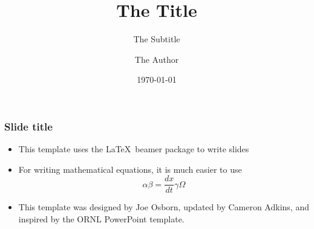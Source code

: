 \documentclass[aspectratio=169, 16pt]{beamer}
\title{The Title}
\subtitle{The Subtitle}
\author{The Author}
\date{\today}
\begin{document}
    \maketitlepage

    \begin{frame}
        \frametitle{\Large{Slide title}}
    	\centering
    	\begin{itemize}
    		\item This template uses the \LaTeX~beamer package to write slides
    		\item For writing mathematical equations, it is much easier to use
    		\[
    			\alpha\beta = \frac{dx}{dt}\gamma\Omega
    		\]
    		\item This template was designed by Joe Osborn, updated by Cameron Adkins, and inspired by the ORNL
                  PowerPoint template.
    	\end{itemize}
    \end{frame}
\end{document}
